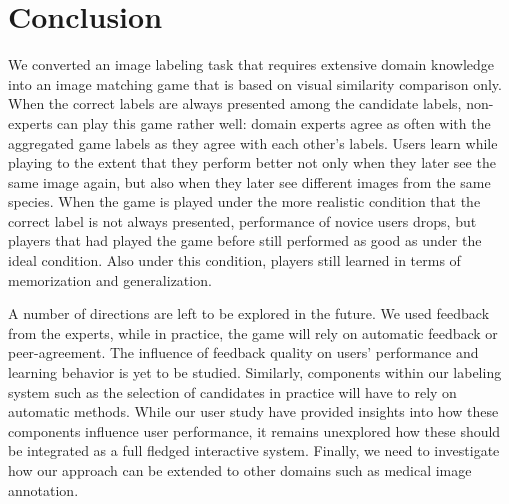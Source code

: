 \section{Conclusion}
\label{sec:con}
We converted an image labeling task that requires extensive domain knowledge into an 
image matching game that is based on visual similarity comparison only.        
%
When the correct labels are always presented among the candidate labels, 
non-experts can play this game rather well: 
domain experts agree as often with the aggregated game labels as they agree with each other's labels. 
Users learn while playing to the extent that they perform better not only when they later see the same image again, 
but also when they later see different images from the same species.
%
When the game is played under the more realistic condition that the correct label is not always presented, 
performance of novice users drops, but players that had played the 
game before still performed as good as under the ideal condition. 
Also under this condition, players still learned in terms of memorization and generalization.



A number of directions are left to be explored in the future. 
%
We used feedback from the experts, while in 
practice, the game will rely on automatic feedback or peer-agreement.
The influence of feedback quality on users' performance and learning behavior
is yet to be studied. 
%
%
Similarly, components within our labeling system such as the selection of candidates 
in practice will have to rely on automatic methods. While our user study have provided insights
into how these components influence user performance, it remains unexplored how these should be integrated
as a full fledged interactive system. 
%
Finally, we need to investigate how our approach can be extended to other domains such as medical image annotation. 


